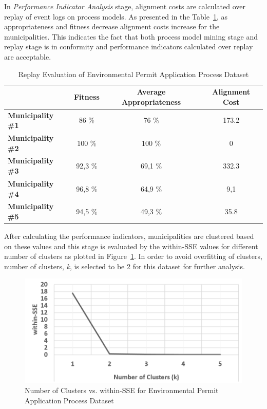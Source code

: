 In \textit{Performance Indicator Analysis} stage, alignment costs are calculated over replay of event logs on process models. As presented in the Table~\ref{table:coselog-wabo-replay}, as appropriateness and fitness decrease alignment costs increase for the municipalities. This indicates the fact that both process model mining stage and replay stage is in conformity and performance indicators calculated over replay are acceptable.
\begin{table}[]
\centering
\caption{Replay Evaluation of Environmental Permit Application Process Dataset}
\label{table:coselog-wabo-replay}
\begin{tabular}{lccc}
\hline
 & {\bf Fitness} & {\bf Average Appropriateness} & {\bf Alignment Cost} \\ \hline
{\bf Municipality \#1} & 86 \% & 76 \% & 173.2 \\ \hline
{\bf Municipality \#2} & 100 \% & 100 \% & 0 \\ \hline
{\bf Municipality \#3} & 92,3 \% & 69,1 \% & 332.3 \\ \hline
{\bf Municipality \#4} & 96,8 \% & 64,9 \% & 9,1 \\ \hline
{\bf Municipality \#5} & 94,5 \% & 49,3 \% & 35.8 \\ \hline
\end{tabular}
\end{table}

After calculating the performance indicators, municipalities are clustered based on these values and this stage is evaluated by the within-SSE values for different number of clusters as plotted in Figure~\ref{fig:coselog-wabo-cluster-sse-plot}. In order to avoid overfitting of clusters, number of clusters, \textit{k}, is selected to be 2 for this dataset for further analysis. 
\begin{figure}
	\centering
	\includegraphics[width=.7\textwidth]{5_results_discussions/coselog-wabo/cluster-sse-plot}
	\caption{Number of Clusters vs. within-SSE for Environmental Permit Application Process Dataset}
  \label{fig:coselog-wabo-cluster-sse-plot}
\end{figure}

